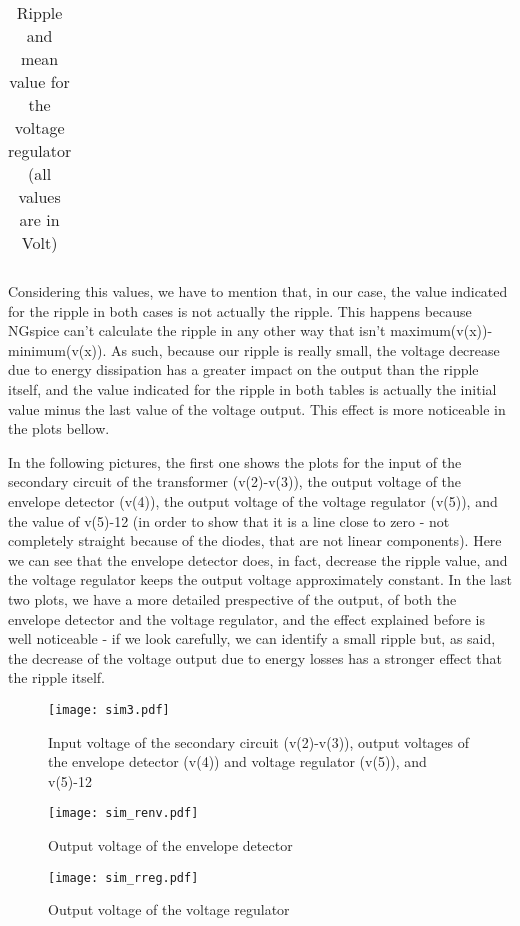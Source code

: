 \begin{table}[h!]
\centering
\begin{tabularx}{0.9\textwidth} {
  | >{\raggedright\arraybackslash}X
  | >{\raggedleft\arraybackslash}X | }
 \hline

\end{tabularx}
\caption{\label{tab:Table 5} Ripple and mean value for the voltage regulator (all values are in Volt)}
\end{table}
\vspace{5mm}

\par Considering this values, we have to mention that, in our case, the value indicated for the ripple in both cases is not actually the ripple. This happens because NGspice can't calculate the ripple in any other way that isn't maximum(v(x))-minimum(v(x)). As such, because our ripple is really small, the voltage decrease due to energy dissipation has a greater impact on the output than the ripple itself, and the value indicated for the ripple in both tables is actually the initial value minus the last value of the voltage output. This effect is more noticeable in the plots bellow.
\par In the following pictures, the first one shows the plots for the input of the secondary circuit of the transformer (v(2)-v(3)), the output voltage of the envelope detector (v(4)), the output voltage of the voltage regulator (v(5)), and the value of v(5)-12 (in order to show that it is a line close to zero - not completely straight because of the diodes, that are not linear components). Here we can see that the envelope detector does, in fact, decrease the ripple value, and the voltage regulator keeps the output voltage approximately constant. In the last two plots, we have a more detailed prespective of the output, of both the envelope detector and the voltage regulator, and the effect explained before is well noticeable - if we look carefully, we can identify a small ripple but, as said, the decrease of the voltage output due to energy losses has a stronger effect that the ripple itself.


\begin{figure}[H] \centering
\texttt{[image: sim3.pdf]}
\caption{Input voltage of the secondary circuit (v(2)-v(3)), output voltages of the envelope detector (v(4)) and voltage regulator (v(5)), and v(5)-12}
\end{figure}

\begin{figure}[H] \centering
\texttt{[image: sim\_renv.pdf]}
\caption{Output voltage of the envelope detector}
\end{figure}

\begin{figure}[H] \centering
\texttt{[image: sim\_rreg.pdf]}
\caption{Output voltage of the voltage regulator}
\end{figure}
